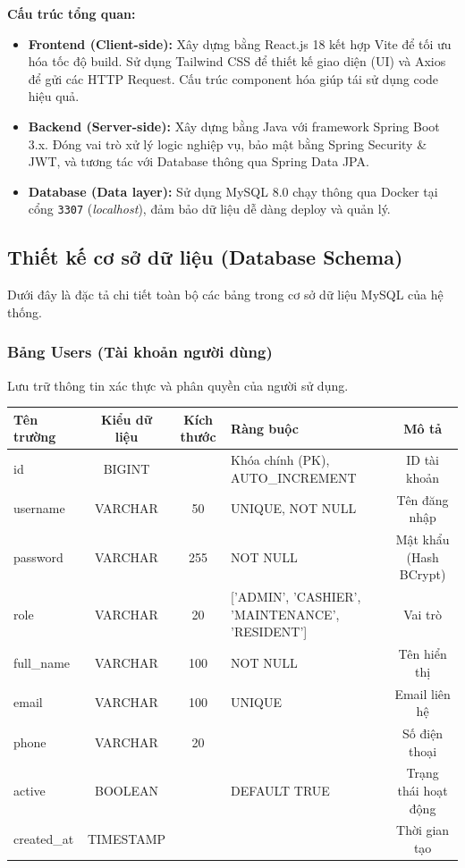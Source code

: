 \documentclass[12pt,a4paper]{article}
\begin{document}
\textbf{Cấu trúc tổng quan:}
\begin{itemize}
    \item \textbf{Frontend (Client-side):} Xây dựng bằng React.js 18 kết hợp Vite để tối ưu hóa tốc độ build. Sử dụng Tailwind CSS để thiết kế giao diện (UI) và Axios để gửi các HTTP Request. Cấu trúc component hóa giúp tái sử dụng code hiệu quả.
    \item \textbf{Backend (Server-side):} Xây dựng bằng Java với framework Spring Boot 3.x. Đóng vai trò xử lý logic nghiệp vụ, bảo mật bằng Spring Security \& JWT, và tương tác với Database thông qua Spring Data JPA.
    \item \textbf{Database (Data layer):} Sử dụng MySQL 8.0 chạy thông qua Docker tại cổng \texttt{3307} (\textit{localhost}), đảm bảo dữ liệu dễ dàng deploy và quản lý.
\end{itemize}

\subsection{Thiết kế cơ sở dữ liệu (Database Schema)}

Dưới đây là đặc tả chi tiết toàn bộ các bảng trong cơ sở dữ liệu MySQL của hệ thống.

\subsubsection{Bảng Users (Tài khoản người dùng)}
Lưu trữ thông tin xác thực và phân quyền của người sử dụng.
\begin{table}[H]
    \centering
    \begin{tabularx}{\textwidth}{|L{2.5cm}|c|c|X|c|}
    \hline
    \textbf{Tên trường} & \textbf{Kiểu dữ liệu} & \textbf{Kích thước} & \textbf{Ràng buộc} & \textbf{Mô tả} \\
    \hline
    id & BIGINT & & Khóa chính (PK), AUTO\_INCREMENT & ID tài khoản \\
    \hline
    username & VARCHAR & 50 & UNIQUE, NOT NULL & Tên đăng nhập \\
    \hline
    password & VARCHAR & 255 & NOT NULL & Mật khẩu (Hash BCrypt) \\
    \hline
    role & VARCHAR & 20 & ['ADMIN', 'CASHIER', 'MAINTENANCE', 'RESIDENT'] & Vai trò \\
    \hline
    full\_name & VARCHAR & 100 & NOT NULL & Tên hiển thị \\
    \hline
    email & VARCHAR & 100 & UNIQUE & Email liên hệ \\
    \hline
    phone & VARCHAR & 20 & & Số điện thoại \\
    \hline
    active & BOOLEAN & & DEFAULT TRUE & Trạng thái hoạt động \\
    \hline
    created\_at & TIMESTAMP & & & Thời gian tạo \\
    \hline
    \end{tabularx}
\end{table}
\end{document}
